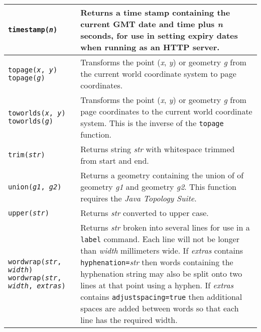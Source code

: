 \begin{longtable}{|p{5cm}|p{7cm}|}
\hline

\texttt{timestamp(\textit{n})} &
Returns a time stamp containing the current GMT date and time plus
\textit{n} seconds, for use in setting expiry dates when
running as an HTTP server. \\

\hline

\texttt{topage(\textit{x}, \textit{y})}
\texttt{topage(\textit{g})} &
Transforms the point (\textit{x}, \textit{y}) or geometry \textit{g}
from the current world coordinate system to page coordinates. \\

\hline

\texttt{toworlds(\textit{x}, \textit{y})}
\texttt{toworlds(\textit{g})} &
Transforms the point (\textit{x}, \textit{y}) or geometry \textit{g}
from page coordinates to the current world coordinate system.
This is the inverse of the \texttt{topage} function. \\

\hline

\texttt{trim(\textit{str})} &
Returns string \textit{str} with whitespace trimmed from start and end. \\

\hline

\texttt{union(\textit{g1}, \textit{g2})} &
Returns a geometry containing the union of 
of geometry \textit{g1} and geometry \textit{g2}.
This function requires the \textit{Java Topology Suite}. \\

\hline

\texttt{upper(\textit{str})} &
Returns \textit{str} converted to upper case. \\

\hline

\texttt{wordwrap(\textit{str}, \textit{width})}
\texttt{wordwrap(\textit{str}, \textit{width}, \textit{extras})} &
Returns \textit{str} broken into several lines for
use in a \texttt{label} command.
Each line will not be
longer than \textit{width} millimeters wide.
If \textit{extras} contains \texttt{hyphenation=}\textit{str} then
words containing the hyphenation
string may also be split onto two lines at that point using a hyphen.
If \textit{extras} contains \texttt{adjustspacing=true} then
additional spaces are added between words so that each line has the
required width.  \\

\hline
\end{longtable}

